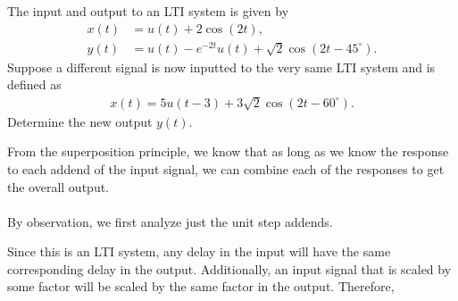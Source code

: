 \documentclass{report}
\begin{document}
\begin{example}
    The input and output to an LTI system is given by 
    \begin{align*}
        x(t) &= u(t)+2\cos(2t), \\ 
        y(t) &= u(t) - e^{-2t}u(t) +\sqrt{2}\cos(2t-45^{\circ}).
    \end{align*}
    Suppose a different signal is now inputted to the very same LTI system and is defined as 
    \begin{align*}
        x(t) = 5u(t-3) + 3\sqrt{2}\cos(2t-60^{\circ}).
    \end{align*}
    Determine the new output $y(t)$.
\end{example}
\begin{solution}
    From the superposition principle, we know that as long as we know the response to each addend of the input signal, 
    we can combine each of the responses to get the overall output.
    \\ \\
    By observation, we first analyze just the unit step addends.
    \begin{center}
    \end{center}
    Since this is an LTI system, any delay in the input will have the same corresponding delay in the output. Additionally, an input signal that is scaled by 
    some factor will be scaled by the same factor in the output. Therefore,
    \begin{center}

\end{center}
\end{solution}
\end{document}
